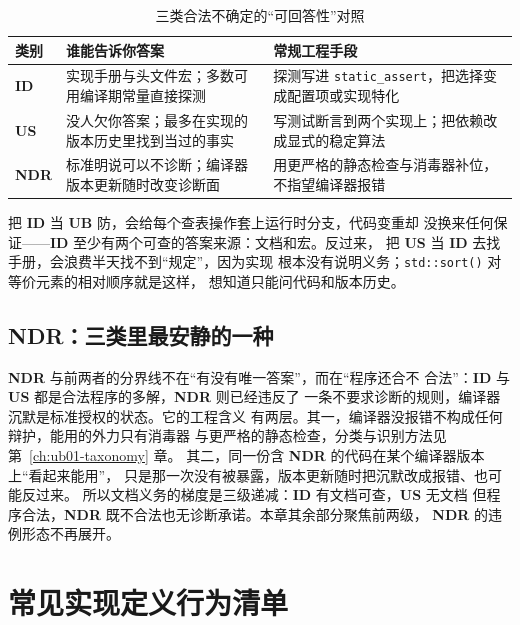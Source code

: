 \documentclass[12pt,a4paper,fontset=fandol]{ctexbook}
\newcommand{\Fn}[1]{\texttt{#1()}}
\newcommand{\Tp}[1]{\texttt{#1}}
\newcommand{\Bk}{\discretionary{}{}{}}
\newcommand{\UB}{\textbf{\textsf{UB}}}
\newcommand{\IDB}{\textbf{\textsf{ID}}}
\newcommand{\USB}{\textbf{\textsf{US}}}
\newcommand{\NDR}{\textbf{\textsf{NDR}}}
\begin{document}
\begin{table}
\centering
\begin{tabular}{@{}>{\raggedright\arraybackslash}p{} >{\raggedright\arraybackslash}p{} >{\raggedright\arraybackslash}p{}@{}}
\toprule
类别 & 谁能告诉你答案 & 常规工程手段 \\
\midrule
\IDB{} & 实现手册与头文件宏；多数可用编译期常量直接探测 &
探测写进 \Tp{static{\Bk}\_assert}，把选择变成配置项或实现特化 \\
\USB{} & 没人欠你答案；最多在实现的版本历史里找到当过的事实 &
写测试断言到两个实现上；把依赖改成显式的稳定算法 \\
\NDR{} & 标准明说可以不诊断；编译器版本更新随时改变诊断面 &
用更严格的静态检查与消毒器补位，不指望编译器报错 \\
\bottomrule
\end{tabular}
\caption{三类合法不确定的“可回答性”对照}\label{tab:ub13-who-answers}
\end{table}

\begin{warning}[title=把三类混为一谈的两种代价]
把 \IDB{} 当 \UB{} 防，会给每个查表操作套上运行时分支，代码变重却
没换来任何保证——\IDB{} 至少有两个可查的答案来源：文档和宏。反过来，
把 \USB{} 当 \IDB{} 去找手册，会浪费半天找不到“规定”，因为实现
根本没有说明义务；\Fn{std::sort} 对等价元素的相对顺序就是这样，
想知道只能问代码和版本历史。
\end{warning}

\subsection{NDR：三类里最安静的一种}\label{sec:ub13-ndr}

\NDR{} 与前两者的分界线不在“有没有唯一答案”，而在“程序还合不
合法”：\IDB{} 与 \USB{} 都是合法程序的多解，\NDR{} 则已经违反了
一条不要求诊断的规则，编译器沉默是标准授权的状态。它的工程含义
有两层。其一，编译器没报错不构成任何辩护，能用的外力只有消毒器
与更严格的静态检查，分类与识别方法见第~\ref{ch:ub01-taxonomy} 章。
其二，同一份含 \NDR{} 的代码在某个编译器版本上“看起来能用”，
只是那一次没有被暴露，版本更新随时把沉默改成报错、也可能反过来。
所以文档义务的梯度是三级递减：\IDB{} 有文档可查，\USB{} 无文档
但程序合法，\NDR{} 既不合法也无诊断承诺。本章其余部分聚焦前两级，
\NDR{} 的违例形态不再展开。

\section{常见实现定义行为清单}\label{sec:ub13-idb-catalogue}
\end{document}
